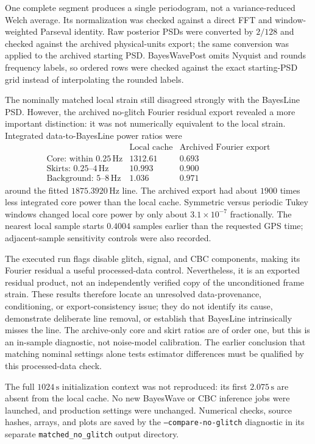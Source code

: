 One complete segment produces a single periodogram, not a variance-reduced
Welch average. Its normalization was checked against a direct FFT and
window-weighted Parseval identity. Raw posterior PSDs were converted by
$2/128$ and checked against the archived physical-units export; the same
conversion was applied to the archived starting PSD. BayesWavePost omits
Nyquist and rounds frequency labels, so ordered rows were checked against
the exact starting-PSD grid instead of interpolating the rounded labels.

The nominally matched local strain still disagreed strongly with the
BayesLine PSD. However, the archived no-glitch Fourier residual export
revealed a more important distinction: it was not numerically equivalent
to the local strain. Integrated data-to-BayesLine power ratios were
\[
\begin{array}{lrr}
 & \text{Local cache} & \text{Archived Fourier export}\\
\text{Core: within }0.25\,\mathrm{Hz} & 1312.61 & 0.693\\
\text{Skirts: }0.25\text{--}4\,\mathrm{Hz} & 10.993 & 0.900\\
\text{Background: }5\text{--}8\,\mathrm{Hz} & 1.036 & 0.971
\end{array}
\]
around the fitted $1875.3920\,\mathrm{Hz}$ line. The archived export had
about $1900$ times less integrated core power than the local cache.
Symmetric versus periodic Tukey windows changed local core power by only
about $3.1\times10^{-7}$ fractionally. The nearest local sample starts
$0.4004$ samples earlier than the requested GPS time; adjacent-sample
sensitivity controls were also recorded.

The executed run flags disable glitch, signal, and CBC components, making
its Fourier residual a useful processed-data control. Nevertheless, it is
an exported residual product, not an independently verified copy of the
unconditioned frame strain. These results therefore locate an unresolved
data-provenance, conditioning, or export-consistency issue; they do not
identify its cause, demonstrate deliberate line removal, or establish that
BayesLine intrinsically misses the line. The archive-only core and skirt
ratios are of order one, but this is an in-sample diagnostic, not noise-model
calibration. The earlier conclusion that matching nominal settings alone
tests estimator differences must be qualified by this processed-data check.

The full $1024\,\mathrm{s}$ initialization context was not reproduced:
its first $2.075\,\mathrm{s}$ are absent from the local cache. No new
BayesWave or CBC inference jobs were launched, and production settings were
unchanged. Numerical checks, source hashes, arrays, and plots are saved by
the \texttt{--compare-no-glitch} diagnostic in its separate
\texttt{matched\_no\_glitch} output directory.

